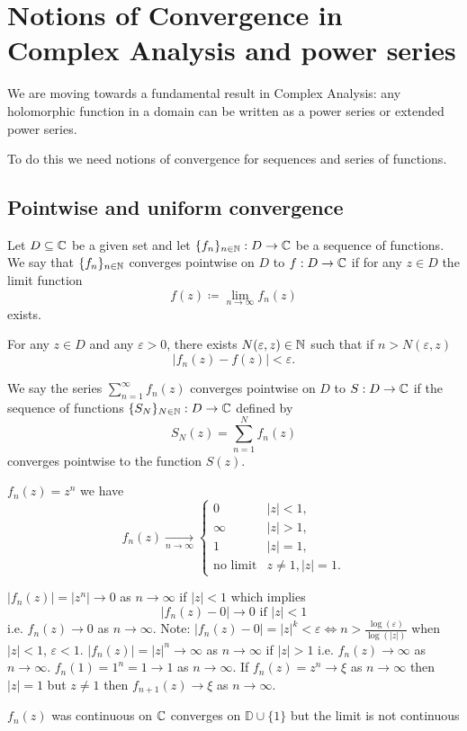 \documentclass[10pt, a4paper]{article}
\begin{document}
\newpage

\section{Notions of Convergence in Complex Analysis and power series}
We are moving towards a fundamental result in Complex Analysis:
any holomorphic function in a domain can be written as a power series or extended power series.

To do this we need notions of convergence for sequences and series of functions.

\subsection{Pointwise and uniform convergence}

\begin{definition}
    Let $D \subseteq \mathbb{C}$ be a given set and let $\{f_n\}_{n \in \mathbb{N}}: D \to \mathbb{C}$ be a sequence of functions.
    We say that $\{f_n\}_{n \in \mathbb{N}}$ converges pointwise on $D$ to $f : D \to \mathbb{C}$ if for any $z \in D$ the limit function
    \[
    f(z) \coloneqq \lim_{n \to \infty}f_n(z)
    \]
    exists.

    For any $z \in D$ and any $\varepsilon > 0$,
    there exists $N(\varepsilon, z) \in \mathbb{N}$ such that if $n > N(\varepsilon, z)$
    \[
    |f_n(z) - f(z)| < \varepsilon.
    \]

    We say the series $\sum_{n = 1}^{\infty}f_n(z)$ converges pointwise on $D$ to $S : D \to \mathbb{C}$ if the sequence of functions $\{S_N\}_{N \in \mathbb{N}} : D \to \mathbb{C}$ defined by
    \[
    S_N(z) = \sum_{n = 1}^{N}f_n(z)
    \]
    converges pointwise to the function $S(z)$.
\end{definition}

\begin{example}
    $f_n(z) = z ^ n$ we have
    \[
    f_n(z) \underset{n \to \infty}{\to} \begin{cases}
        0 & |z| < 1, \\
        \infty & |z| > 1, \\
        1 & |z| = 1, \\
        \text{no limit} & z \neq 1, |z| = 1.
    \end{cases}
    \]

    $|f_n(z)| = |z ^ n| \to 0$ as $n \to \infty$ if $|z| < 1$ which implies
    \[
    |f_n(z) - 0| \to 0\text{ if } |z| < 1
    \]
    i.e. $f_n(z) \to 0$ as $n \to \infty$.
    Note:
    $|f_n(z) - 0| = |z| ^ k < \varepsilon \iff n > \frac{\log(\varepsilon)}{\log(|z|)}$
    when $|z| < 1$,
    $\varepsilon < 1$.
    $|f_n(z)| = |z| ^ n \to \infty$ as $n \to \infty$ if $|z| > 1$ i.e. $f_n(z) \to \infty$ as $n \to \infty$.
    $f_n(1) = 1 ^ n = 1 \to 1$ as $n \to \infty$.
    If $f_n(z) = z ^ n \to \xi$ as $n \to \infty$ then $|z| = 1$ but $z \neq 1$ then $f_{n + 1}(z) \to \xi$ as $n \to \infty$.

    $f_n(z)$ was continuous on $\mathbb{C}$ converges on $\mathbb{D} \cup \{1\}$ but the limit is not continuous
\end{example}
\end{document}
